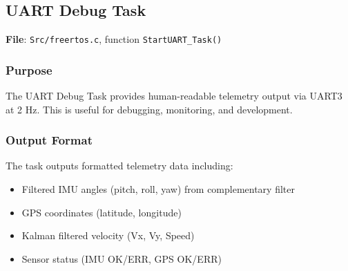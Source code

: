 \documentclass[11pt,a4paper]{article}
\begin{document}
\subsection{UART Debug Task}
\textbf{File}: \texttt{Src/freertos.c}, function \texttt{StartUART\_Task()}

\subsubsection{Purpose}
The UART Debug Task provides human-readable telemetry output via UART3 at 2 Hz. This is useful for debugging, monitoring, and development.

\subsubsection{Output Format}
The task outputs formatted telemetry data including:
\begin{itemize}
    \item Filtered IMU angles (pitch, roll, yaw) from complementary filter
    \item GPS coordinates (latitude, longitude)
    \item Kalman filtered velocity (Vx, Vy, Speed)
    \item Sensor status (IMU OK/ERR, GPS OK/ERR)
\end{itemize}
\end{document}
